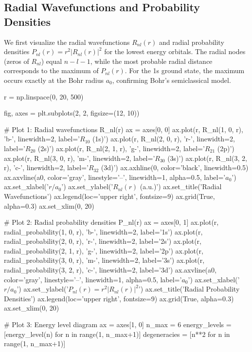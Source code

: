 \documentclass[11pt,a4paper]{article}
\begin{document}
\subsection{Radial Wavefunctions and Probability Densities}

We first visualize the radial wavefunctions $R_{nl}(r)$ and radial probability densities $P_{nl}(r) = r^2|R_{nl}(r)|^2$ for the lowest energy orbitals. The radial nodes (zeros of $R_{nl}$) equal $n-l-1$, while the most probable radial distance corresponds to the maximum of $P_{nl}(r)$. For the 1s ground state, the maximum occurs exactly at the Bohr radius $a_0$, confirming Bohr's semiclassical model.

\begin{pycode}
r = np.linspace(0, 20, 500)

fig, axes = plt.subplots(2, 2, figsize=(12, 10))

# Plot 1: Radial wavefunctions R_nl(r)
ax = axes[0, 0]
ax.plot(r, R_nl(1, 0, r), 'b-', linewidth=2, label='$R_{10}$ (1s)')
ax.plot(r, R_nl(2, 0, r), 'r-', linewidth=2, label='$R_{20}$ (2s)')
ax.plot(r, R_nl(2, 1, r), 'g-', linewidth=2, label='$R_{21}$ (2p)')
ax.plot(r, R_nl(3, 0, r), 'm-', linewidth=2, label='$R_{30}$ (3s)')
ax.plot(r, R_nl(3, 2, r), 'c-', linewidth=2, label='$R_{32}$ (3d)')
ax.axhline(0, color='black', linewidth=0.5)
ax.axvline(a0, color='gray', linestyle='--', linewidth=1, alpha=0.5, label='$a_0$')
ax.set_xlabel('$r/a_0$')
ax.set_ylabel('$R_{nl}(r)$ (a.u.)')
ax.set_title('Radial Wavefunctions')
ax.legend(loc='upper right', fontsize=9)
ax.grid(True, alpha=0.3)
ax.set_xlim(0, 20)

# Plot 2: Radial probability densities P_nl(r)
ax = axes[0, 1]
ax.plot(r, radial_probability(1, 0, r), 'b-', linewidth=2, label='1s')
ax.plot(r, radial_probability(2, 0, r), 'r-', linewidth=2, label='2s')
ax.plot(r, radial_probability(2, 1, r), 'g-', linewidth=2, label='2p')
ax.plot(r, radial_probability(3, 0, r), 'm-', linewidth=2, label='3s')
ax.plot(r, radial_probability(3, 2, r), 'c-', linewidth=2, label='3d')
ax.axvline(a0, color='gray', linestyle='--', linewidth=1, alpha=0.5, label='$a_0$')
ax.set_xlabel('$r/a_0$')
ax.set_ylabel('$P_{nl}(r) = r^2|R_{nl}(r)|^2$')
ax.set_title('Radial Probability Densities')
ax.legend(loc='upper right', fontsize=9)
ax.grid(True, alpha=0.3)
ax.set_xlim(0, 20)

# Plot 3: Energy level diagram
ax = axes[1, 0]
n_max = 6
energy_levels = [energy_level(n) for n in range(1, n_max+1)]
degeneracies = [n**2 for n in range(1, n_max+1)]


\end{pycode}
\end{document}
